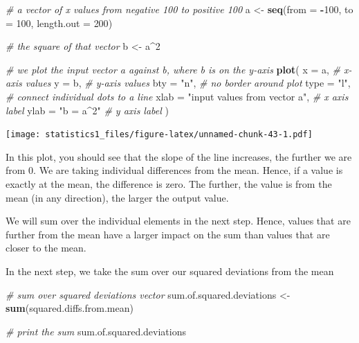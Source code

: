 \documentclass[]{book}
\newenvironment{Shaded}{\begin{snugshade}}{\end{snugshade}}
\newcommand{\KeywordTok}[1]{\textcolor[rgb]{0.13,0.29,0.53}{\textbf{#1}}}
\newcommand{\DataTypeTok}[1]{\textcolor[rgb]{0.13,0.29,0.53}{#1}}
\newcommand{\DecValTok}[1]{\textcolor[rgb]{0.00,0.00,0.81}{#1}}
\newcommand{\StringTok}[1]{\textcolor[rgb]{0.31,0.60,0.02}{#1}}
\newcommand{\CommentTok}[1]{\textcolor[rgb]{0.56,0.35,0.01}{\textit{#1}}}
\newcommand{\OperatorTok}[1]{\textcolor[rgb]{0.81,0.36,0.00}{\textbf{#1}}}
\newcommand{\NormalTok}[1]{#1}
\theoremstyle{definition}
\theoremstyle{definition}
\theoremstyle{definition}
\theoremstyle{remark}
\begin{document}
\begin{Shaded}
\begin{Highlighting}[]
\CommentTok{# a vector of x values from negative 100 to positive 100}
\NormalTok{a <-}\StringTok{ }\KeywordTok{seq}\NormalTok{(}\DataTypeTok{from =} \OperatorTok{-}\DecValTok{100}\NormalTok{, }\DataTypeTok{to =} \DecValTok{100}\NormalTok{, }\DataTypeTok{length.out =} \DecValTok{200}\NormalTok{)}

\CommentTok{# the square of that vector}
\NormalTok{b <-}\StringTok{ }\NormalTok{a}\OperatorTok{^}\DecValTok{2}

\CommentTok{# we plot the input vector a against b, where b is on the y-axis}
\KeywordTok{plot}\NormalTok{(}
  \DataTypeTok{x =}\NormalTok{ a, }\CommentTok{# x-axis values}
  \DataTypeTok{y =}\NormalTok{ b, }\CommentTok{# y-axis values}
  \DataTypeTok{bty =} \StringTok{"n"}\NormalTok{, }\CommentTok{# no border around plot}
  \DataTypeTok{type =} \StringTok{"l"}\NormalTok{, }\CommentTok{# connect individual dots to a line}
  \DataTypeTok{xlab =} \StringTok{"input values from vector a"}\NormalTok{, }\CommentTok{# x axis label}
  \DataTypeTok{ylab =} \StringTok{"b = a^2"} \CommentTok{# y axis label}
\NormalTok{)}
\end{Highlighting}
\end{Shaded}

\texttt{[image: statistics1\_files/figure-latex/unnamed-chunk-43-1.pdf]}

In this plot, you should see that the slope of the line increases, the
further we are from 0. We are taking individual differences from the
mean. Hence, if a value is exactly at the mean, the difference is zero.
The further, the value is from the mean (in any direction), the larger
the output value.

We will sum over the individual elements in the next step. Hence, values
that are further from the mean have a larger impact on the sum than
values that are closer to the mean.

In the next step, we take the sum over our squared deviations from the
mean

\begin{Shaded}
\begin{Highlighting}[]
\CommentTok{# sum over squared deviations vector}
\NormalTok{sum.of.squared.deviations <-}\StringTok{ }\KeywordTok{sum}\NormalTok{(squared.diffs.from.mean)}

\CommentTok{# print the sum}
\NormalTok{sum.of.squared.deviations}
\end{Highlighting}
\end{Shaded}
\end{document}
